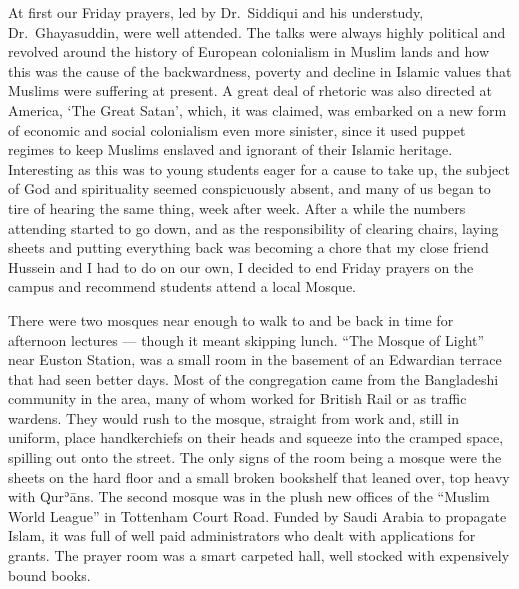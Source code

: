 \documentclass[12pt]{memoir}
\def\´{ʾ} %
\def \Quran{Qur\-\´ān} %
\begin{document}
At first our Friday prayers, led by Dr.\ Siddiqui and his understudy,
Dr.\ Ghayasuddin, were well attended.
The talks were always highly political
and revolved around the history of European colonialism in Muslim lands
and how this was the cause of the backwardness,
poverty and decline in Islamic values that Muslims were suffering at present.
A great deal of rhetoric was also directed at America,
‘The Great Satan’, which, it was claimed,
was embarked on a new form of economic
and social colonialism even more sinister,
since it used puppet regimes to keep Muslims enslaved
and ignorant of their Islamic heritage.
Interesting as this was to young students eager for a cause to take up,
the subject of God and spirituality seemed conspicuously absent,
and many of us began to tire of hearing the same thing,
week after week.
After a while the numbers attending started to go down,
and as the responsibility of clearing chairs,
laying sheets and putting everything back was becoming a chore
that my close friend Hussein and I had to do on our own,
I decided to end Friday prayers on the campus
and recommend students attend a local Mosque.

There were two mosques near enough to walk to
and be back in time for afternoon lectures — though it meant skipping lunch.
“The Mosque of Light” near Euston Station,
was a small room in the basement of an Edwardian terrace
that had seen better days.
Most of the congregation came from the Bangladeshi community in the area,
many of whom worked for British Rail or as traffic wardens.
They would rush to the mosque, straight from work and,
still in uniform, place handkerchiefs on their heads
and squeeze into the cramped space, spilling out onto the street.
The only signs of the room being a mosque were the sheets on the hard floor
and a small broken bookshelf that leaned over, top heavy with \Quran{}s.
The second mosque was in the plush new offices
of the “Muslim World League” in Tottenham Court Road.
Funded by Saudi Arabia to propagate Islam,
it was full of well paid administrators
who dealt with applications for grants.
The prayer room was a smart carpeted hall,
well stocked with expensively bound books.
\end{document}
